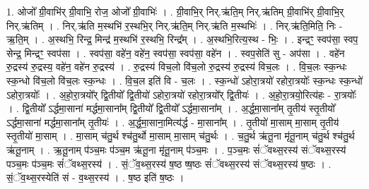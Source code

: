 \documentclass[17pt]{extarticle}
\begin{document}
1. ओजो᳚ ग्री॒वाभि॑र् ग्री॒वाभि॒ रोज॒ ओजो᳚ ग्री॒वाभिः॑ । . ग्री॒वाभि॒र् निर्.ऋ॑ति॒म् निर्.ऋ॑तिम् ग्री॒वाभि॑र् ग्री॒वाभि॒र् निर्.ऋ॑तिम् । . निर्.ऋ॑ति म॒स्थभि॑ र॒स्थभि॒र् निर्.ऋ॑ति॒म् निर्.ऋ॑ति म॒स्थभिः॑ । . निर्.ऋ॑ति॒मिति॒ निः - ऋ॒ति॒म् । . अ॒स्थभि॒ रिन्द्र॒ मिन्द्र॑ म॒स्थभि॑ र॒स्थभि॒ रिन्द्र᳚म् । . अ॒स्थभि॒रित्य॒स्थ - भिः॒ । . इन्द्रꣳ॒॒ स्वप॑सा॒ स्वप॒ सेन्द्र॒ मिन्द्रꣳ॒॒ स्वप॑सा । . स्वप॑सा॒ वहे॑न॒ वहे॑न॒ स्वप॑सा॒ स्वप॑सा॒ वहे॑न । . स्वप॒सेति॑ सु - अप॑सा । . वहे॑न रु॒द्रस्य॑ रु॒द्रस्य॒ वहे॑न॒ वहे॑न रु॒द्रस्य॑ । . रु॒द्रस्य॑ विच॒लो वि॑च॒लो रु॒द्रस्य॑ रु॒द्रस्य॑ विच॒लः । . वि॒च॒लः स्क॒न्धः स्क॒न्धो वि॑च॒लो वि॑च॒लः स्क॒न्धः । . वि॒च॒ल इति॑ वि - च॒लः । . स्क॒न्धो॑ ऽहोरा॒त्रयो॑ रहोरा॒त्रयोः᳚ स्क॒न्धः स्क॒न्धो॑ ऽहोरा॒त्रयोः᳚ । . अ॒हो॒रा॒त्रयो᳚र् द्वि॒तीयो᳚ द्वि॒तीयो॑ ऽहोरा॒त्रयो॑ रहोरा॒त्रयो᳚र् द्वि॒तीयः॑ । . अ॒हो॒रा॒त्रयो॒रित्य॑हः - रा॒त्रयोः᳚ । . द्वि॒तीयो᳚ ऽर्द्धमा॒साना॑ मर्द्धमा॒साना᳚म् द्वि॒तीयो᳚ द्वि॒तीयो᳚ ऽर्द्धमा॒साना᳚म् । . अ॒र्द्ध॒मा॒साना᳚म् तृ॒तीय॑ स्तृ॒तीयो᳚ ऽर्द्धमा॒साना॑ मर्द्धमा॒साना᳚म् तृ॒तीयः॑ । . अ॒र्द्ध॒मा॒साना॒मित्य॑र्द्ध - मा॒साना᳚म् । . तृ॒तीयो॑ मा॒साम् मा॒साम् तृ॒तीय॑ स्तृ॒तीयो॑ मा॒साम् । . मा॒साम् च॑तु॒र्थ श्च॑तु॒र्थो मा॒साम् मा॒साम् च॑तु॒र्थः । . च॒तु॒र्थ ऋ॑तू॒ना मृ॑तू॒नाम् च॑तु॒र्थ श्च॑तु॒र्थ ऋ॑तू॒नाम् । . ऋ॒तू॒नाम् प॑ञ्च॒मः प॑ञ्च॒म ऋ॑तू॒ना मृ॑तू॒नाम् प॑ञ्च॒मः । . प॒ञ्च॒मः सं॑ॅवथ्स॒रस्य॑ संॅवथ्स॒रस्य॑ पञ्च॒मः प॑ञ्च॒मः सं॑ॅवथ्स॒रस्य॑ । . सं॒ॅव॒थ्स॒रस्य॑ ष॒ष्ठ ष्ष॒ष्ठः सं॑ॅवथ्स॒रस्य॑ संॅवथ्स॒रस्य॑ ष॒ष्ठः । . सं॒ॅव॒थ्स॒रस्येति॑ सं - व॒थ्स॒रस्य॑ । . ष॒ष्ठ इति॑ ष॒ष्ठः । \newline
\end{document}
